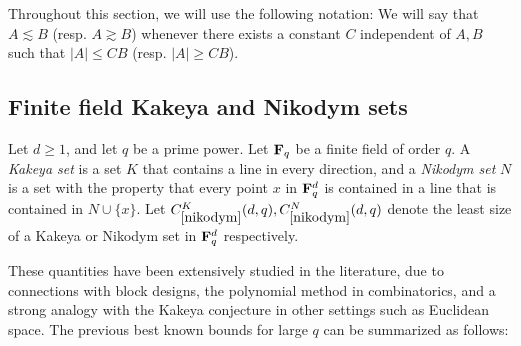 Throughout this section, we will use the following notation: We will say that $A \lesssim B$ (resp. $A \gtrsim B$) whenever there exists a constant $C$ independent of $A,B$ such that $|A| \leq CB$ (resp. $|A| \geq CB$).


\localtableofcontents




\subsection{Finite field Kakeya and Nikodym sets}
\label{sec:nikodym}


\renewcommand{\problemURL}{https://google-deepmind.github.io/alphaevolve_repository_of_problems/problems/1.html}

\begin{problem}\label{nikodym} Let $d \geq 1$, and let $q$ be a prime power.  Let $\mathbf{F}_q$ be a finite field of order $q$.  A \emph{Kakeya set} is a set $K$ that contains a line in every direction, and a \emph{Nikodym set} $N$ is a set with the property that every point $x$ in $\mathbf{F}_q^d$ is contained in a line that is contained in $N \cup \{x\}$.  Let $C^K_{\ref{nikodym}}(d,q), C^N_{\ref{nikodym}}(d,q)$ denote the least size of a Kakeya or Nikodym set in $\mathbf{F}_q^d$ respectively.
\end{problem}

These quantities have been extensively studied in the literature, due to connections with block designs, the polynomial method in combinatorics, and a strong analogy with the Kakeya conjecture in other settings such as Euclidean space.  The previous best known bounds for large $q$ can be summarized as follows:

